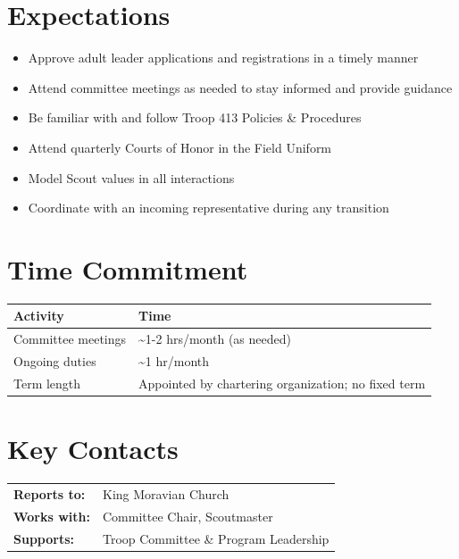 \documentclass[11pt, letterpaper]{article}
\begin{document}
\hfill
\begin{minipage}[t]{0.48\linewidth}
\raggedright

\section{Expectations}
\begin{itemize}
  \item Approve adult leader applications and registrations in a timely manner
  \item Attend committee meetings as needed to stay informed and provide guidance
  \item Be familiar with and follow Troop 413 Policies \& Procedures
  \item Attend quarterly Courts of Honor in the Field Uniform
  \item Model Scout values in all interactions
  \item Coordinate with an incoming representative during any transition
\end{itemize}

\section{Time Commitment}
\begin{tabular}{@{}p{3.0cm} >{\raggedright\arraybackslash}p{3.8cm}@{}}
  \toprule
  \textbf{Activity} & \textbf{Time} \\
  \midrule
  Committee meetings & \textasciitilde{}1-2 hrs/month (as needed) \\
  Ongoing duties    & \textasciitilde{}1 hr/month \\
  Term length       & Appointed by chartering organization; no fixed term \\
  \bottomrule
\end{tabular}

\vspace{1em}

\section{Key Contacts}
\begin{tabular}{@{}p{2.6cm} >{\raggedright\arraybackslash}p{4.2cm}@{}}
  \textbf{Reports to:}  & King Moravian Church \\
  \textbf{Works with:}  & Committee Chair, Scoutmaster \\
  \textbf{Supports:}    & Troop Committee \& Program Leadership \\
\end{tabular}

\end{minipage}
\end{document}
